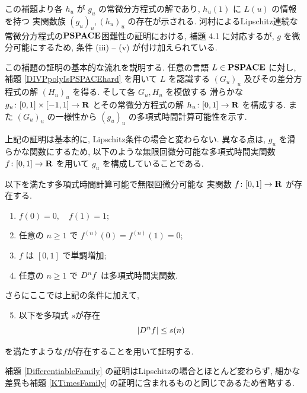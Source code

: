 この補題より各 $h_u$ が $g_u$ の常微分方程式の解であり, 
 $h_u(1)$ に $L(u)$ の情報を持つ
 実関数族 $(g_u)_u, (h_u)_u$ の存在が示される.
 河村によるLipschitz連続な常微分方程式の$\mathbf{PSPACE}$困難性の証明における,
 補題 4.1 に対応するが,
 $g$ を微分可能にするため, 条件 (iii) -- (v) が付け加えられている.
 

 この補題の証明の基本的な流れを説明する.
 任意の言語 $L \in \mathbf{PSPACE}$ に対し, 
 補題 \ref{DIVPpolyIsPSPACEhard} を用いて $L$ を認識する $(G_u)_u$ 
 及びその差分方程式の解 $(H_u)_u$ を得る.
 そして各 $G_u, H_u$ を模倣する
 滑らかな $g_u \colon [0,1] \times [-1, 1] \to \mathbf R$ 
 とその常微分方程式の解 $h_u \colon [0,1] \to \mathbf R$ を構成する.
 また $(G_u)_u$ の一様性から $(g_u)_u$ の多項式時間計算可能性を示す.


 上記の証明は基本的に, Lipschitz条件の場合と変わらない.
 異なる点は, $g_u$ を滑らかな関数にするため, 
 以下のような無限回微分可能な多項式時間実関数 $f \colon [0,1] \to \mathbf R$ を用いて
 $g_u$ を構成していることである.

 \begin{lemma}
  \label{SmoothFunction}
  以下を満たす多項式時間計算可能で無限回微分可能な
  実関数 $f \colon [0,1] \to \mathbf R$ が存在する.

  \begin{enumerate}
   \item $f(0) = 0, \quad f(1) = 1$;
   \item 任意の $n \ge 1$ で $f^{(n)}(0) = f^{(n)}(1) = 0$;
   \item $f$ は $[0,1]$ で単調増加;
   \item 任意の $n \ge 1$ で $D^n f$ は多項式時間実関数.
  \end{enumerate}
 \end{lemma}

 さらにここでは上記の条件に加えて, 
 \begin{enumerate}
  \setcounter{enumi}{4} 
  \item 以下を多項式 $s$が存在
	\begin{equation} \label{enum:polynomial-size}
	 |D^n f| \le s(n)
	\end{equation}
 \end{enumerate}
 を満たすような$f$が存在することを用いて証明する.

 補題 \ref{DifferentiableFamily} の証明はLipschitzの場合とほとんど変わらず,
 細かな差異も補題 \ref{KTimesFamily} の証明に含まれるものと同じであるため省略する.

